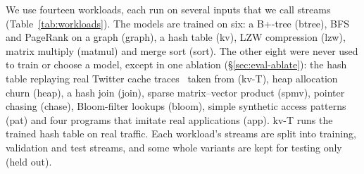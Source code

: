 \documentclass{article}
\begin{document}
We use fourteen workloads, each run on several inputs that we call streams (Table~\ref{tab:workloads}). The models are trained on six: a B+-tree (btree), BFS and PageRank on a graph (graph), a hash table (kv), LZW compression (lzw), matrix multiply (matmul) and merge sort (sort). The other eight were never used to train or choose a model, except in one ablation (\S\ref{sec:eval-ablate}): the hash table replaying real Twitter cache traces~\citep{yang2020twitter} taken from \citet{zussman2025cacheext} (kv-T), heap allocation churn (heap), a hash join (join), sparse matrix--vector product (spmv), pointer chasing (chase), Bloom-filter lookups (bloom), simple synthetic access patterns (pat) and four programs that imitate real applications (app). kv-T runs the trained hash table on real traffic. Each workload's streams are split into training, validation and test streams, and some whole variants are kept for testing only (held out).
\end{document}
